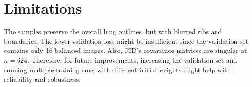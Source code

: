 \documentclass{article}
\begin{document}
\section{Limitations}
The samples preserve the overall lung outlines, but with blurred ribs and boundaries. The lower validation loss might be insufficient since the validation set contains only 16 balanced images. Also, FID’s covariance matrices are singular at $n=624$. Therefore, for future improvements, increasing the validation set and running multiple training runs with different initial weights might help with reliability and robustness.
\end{document}
